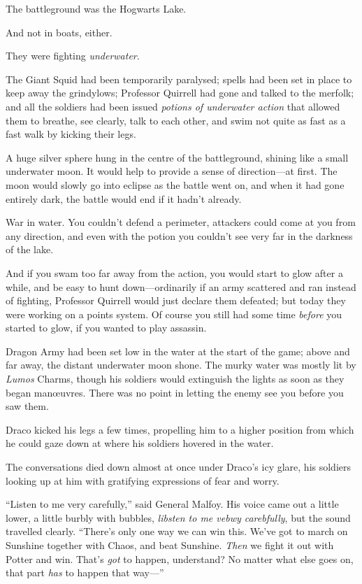 The battleground was the Hogwarts Lake.

And not in boats, either.

They were fighting \emph{underwater}.

The Giant Squid had been temporarily paralysed; spells had been set in place to keep away the grindylows; Professor Quirrell had gone and talked to the merfolk; and all the soldiers had been issued \emph{potions of underwater action} that allowed them to breathe, see clearly, talk to each other, and swim not quite as fast as a fast walk by kicking their legs.

A huge silver sphere hung in the centre of the battleground, shining like a small underwater moon. It would help to provide a sense of direction—at first. The moon would slowly go into eclipse as the battle went on, and when it had gone entirely dark, the battle would end if it hadn’t already.

War in water. You couldn’t defend a perimeter, attackers could come at you from any direction, and even with the potion you couldn’t see very far in the darkness of the lake.

And if you swam too far away from the action, you would start to glow after a while, and be easy to hunt down—ordinarily if an army scattered and ran instead of fighting, Professor Quirrell would just declare them defeated; but today they were working on a points system. Of course you still had some time \emph{before} you started to glow, if you wanted to play assassin.

Dragon Army had been set low in the water at the start of the game; above and far away, the distant underwater moon shone. The murky water was mostly lit by \emph{Lumos} Charms, though his soldiers would extinguish the lights as soon as they began manœuvres. There was no point in letting the enemy see you before you saw them.

Draco kicked his legs a few times, propelling him to a higher position from which he could gaze down at where his soldiers hovered in the water.

The conversations died down almost at once under Draco’s icy glare, his soldiers looking up at him with gratifying expressions of fear and worry.

“Listen to me very carefully,” said General Malfoy. His voice came out a little lower, a little burbly with bubbles, \emph{libsten to me vebwy carebfully}, but the sound travelled clearly. “There’s only one way we can win this. We’ve got to march on Sunshine together with Chaos, and beat Sunshine. \emph{Then} we fight it out with Potter and win. That’s \emph{got} to happen, understand? No matter what else goes on, that part \emph{has} to happen that way—”

